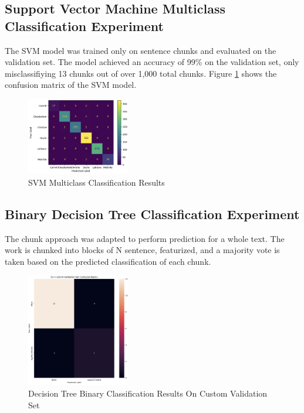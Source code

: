 \documentclass[journal]{IEEEtran} %
\begin{document}
\subsection{Support Vector Machine Multiclass Classification Experiment}

The SVM model was trained only on sentence chunks and evaluated on the validation set. The model achieved an accuracy of 99\% on the validation set, only misclassifiying 13 chunks out of over 1,000 total chunks. Figure \ref{svm} shows the confusion matrix of the SVM model.

\begin{figure}
    \caption{SVM Multiclass Classification Results}
    \begin{center}
    \centerline{\includegraphics[width=0.4\textwidth]{./svm.png}}
    \end{center}
    \centering
    \label{svm}
\end{figure}

\subsection{Binary Decision Tree Classification Experiment}

The chunk approach was adapted to perform prediction for a whole text. The work is chunked into blocks of N sentence, featurized, and a majority vote is taken based on the predicted classification of each chunk.

\begin{figure}[h!]
    \caption{Decision Tree Binary Classification Results On Custom Validation Set}
    \begin{center}
    \centerline{\includegraphics[width=0.4\textwidth]{./dt1.png}}
    \end{center}
    \centering
    \label{dt}
\end{figure}
\end{document}

